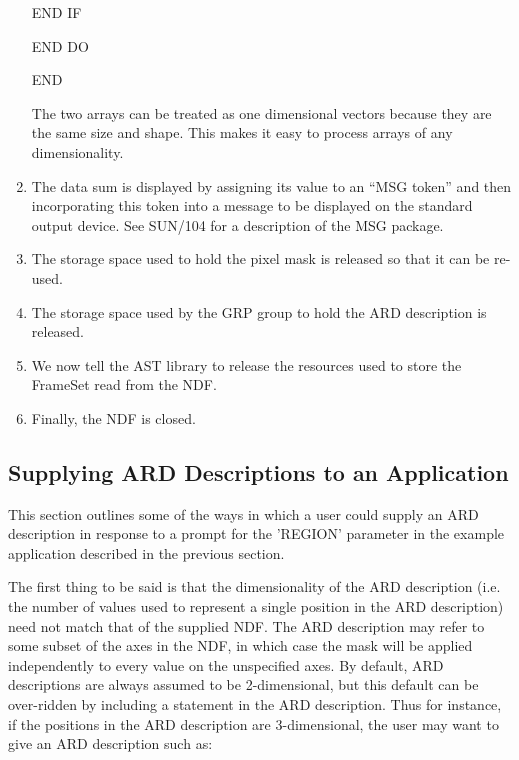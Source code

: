 \documentclass[11pt,nolof]{starlink}
\begin{document}
\begin{enumerate}
\begin{terminalv}
         END IF

      END DO

      END
\end{terminalv}
\normalsize

The two arrays can be treated as one dimensional vectors because they are the
same size and shape. This makes it easy to process arrays of any dimensionality.


\item The data sum is displayed by assigning its value to an ``MSG token'' and
then incorporating this token into a message to be displayed on the standard
output device. See SUN/104 for a description of the MSG package.

\item The storage space used to hold the pixel mask is released so that it can
be re-used.

\item The storage space used by the GRP group to hold the ARD description is
released.

\item We now tell the AST library to release the resources used to store
the FrameSet read from the NDF.

\item Finally, the NDF is closed.
\end{enumerate}

\subsection{Supplying ARD Descriptions to an Application}
This section outlines some of the ways in which a user could supply an ARD
description in response to a prompt for the 'REGION' parameter in the example
application described in the previous section.

The first thing to be said is that the dimensionality of the ARD
description (i.e. the number of values used to represent a single
position in the ARD description) need not match that of the supplied NDF.
The ARD description may refer to some subset of the axes in the NDF, in
which case the mask will be applied independently to every value on the
unspecified axes. By default, ARD descriptions are always assumed to be
2-dimensional, but this default can be over-ridden by including a
 statement in the ARD description. Thus for
instance, if the positions in the ARD description are 3-dimensional, the user
may want to give an ARD description such as:
\end{document}
